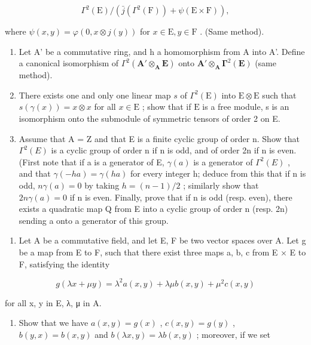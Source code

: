 \[
\Gamma^ {2} (\mathrm{E}) / (\bar {j} (\Gamma^ {2} (\mathrm{F})) + \psi (\mathrm{E} \times \mathrm{F})),
\]

where \(\psi(x, y) = \varphi(0, x \otimes j(y))\) for \(x \in \mathrm{E}, y \in \mathrm{F}\) . (Same method).

\begin{enumerate}
\def\labelenumi{\alph{enumi})}
\setcounter{enumi}{3}
\item
  Let A' be a commutative ring, and h a homomorphism from A into A'. Define a canonical isomorphism of \(\Gamma^{2}(\mathbf{A}'\otimes_{\mathbf{A}}\mathbf{E})\) onto \(\mathbf{A}'\otimes_{\mathbf{A}}\symbf{\Gamma}^{2}(\mathbf{E})\) (same method).
\item
  There exists one and only one linear map \(s\) of \(\Gamma^{2}(\mathrm{E})\) into \(\mathrm{E}\otimes\mathrm{E}\) such that \(s(\gamma(x))=x\otimes x\) for all \(x\in\mathrm{E}\) ; show that if \(\mathrm{E}\) is a free module, s is an isomorphism onto the submodule of symmetric tensors of order 2 on E.
\item
  Assume that A = Z and that E is a finite cyclic group of order n. Show that \(\Gamma^{2}(E)\) is a cyclic group of order n if n is odd, and of order 2n if n is even. (First note that if a is a generator of E, \(\gamma(a)\) is a generator of \(\Gamma^{2}(E)\) , and that \(\gamma(-ha) = \gamma(ha)\) for every integer h; deduce from this that if n is odd, \(n\gamma(a) = 0\) by taking \(h = (n - 1)/2\) ; similarly show that \(2n\gamma(a) = 0\) if n is even. Finally, prove that if n is odd (resp. even), there exists a quadratic map Q from E into a cyclic group of order n (resp. 2n) sending a onto a generator of this group.
\end{enumerate}

\begin{enumerate}
\def\labelenumi{\arabic{enumi})}
\setcounter{enumi}{7}
\tightlist
\item
  Let A be a commutative field, and let E, F be two vector spaces over A. Let g be a map from E to F, such that there exist three maps a, b, c from E × E to F, satisfying the identity
\end{enumerate}

\[
g (\lambda x + \mu y) = \lambda^ {2} a (x, y) + \lambda \mu b (x, y) + \mu^ {2} c (x, y)\tag{4}
\]

for all x, y in E, λ, μ in A.

\begin{enumerate}
\def\labelenumi{\alph{enumi})}
\tightlist
\item
  Show that we have \(a(x, y) = g(x)\) , \(c(x, y) = g(y)\) , \(b(y, x) = b(x, y)\) and \(b(\lambda x, y) = \lambda b(x, y)\) ; moreover, if we set
\end{enumerate}

